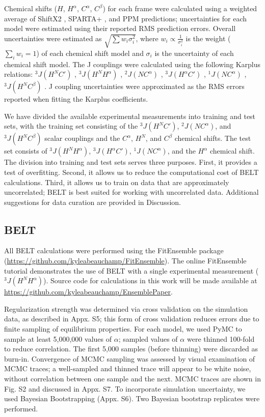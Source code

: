 \documentclass[11pt,titlepage]{article}
\begin{document}
Chemical shifts ($H$, $H^\alpha$, $C^\alpha$, $C^\beta$) for each frame were calculated using a weighted average of ShiftX2 \citep{han2011shiftx2}, SPARTA+  \citep{Shen2010}, and PPM \citep{li2012ppm} predictions; uncertainties for each model were estimated using their reported RMS prediction errors.  Overall uncertainties were estimated as $\sqrt{\sum w_i \sigma_i^2}$, where $w_i \propto \frac{1}{\sigma_i^2}$ is the weight ($\sum_i w_i = 1$) of each chemical shift model and $\sigma_i$ is the uncertainty of each chemical shift model.  The J couplings were calculated using the following Karplus relations: $^3J(H^N C')$  \citep{vogeli2007limits}, $^3J(H^N H^\alpha)$  \citep{vogeli2007limits}, $^2J(N C^\alpha)$  \citep{Graf2007}, $^3J(H^\alpha C')$  \citep{Schmidt1999}, $^1J(N C^\alpha)$  \citep{Graf2007}, $^3J(H^N C^\beta)$  \citep{vogeli2007limits}.  J coupling uncertainties were approximated as the RMS errors reported when fitting the Karplus coefficients.  

We have divided the available experimental measurements into training and test sets, with the training set consisting of the $^3J(H^N C')$,  $^2J(N C^\alpha)$, and $^3J(H^N C^\beta)$ scalar couplings and the $C^\alpha$, $H^N$, and $C^\beta$ chemical shifts.  The test set consists of $^3J(H^N H^\alpha)$, $^3J(H^\alpha C')$, $^1J(N C^\alpha)$, and the $H^\alpha$ chemical shift.  The division into training and test sets serves three purposes.  First, it provides a test of overfitting.  Second, it allows us to reduce the computational cost of BELT calculations.  Third, it allows us to train on data that are approximately uncorrelated; BELT is best suited for working with uncorrelated data.  Additional suggestions for data curation are provided in Discussion.  

\subsection*{BELT}

All BELT calculations were performed using the FitEnsemble package (\url{https://github.com/kyleabeauchamp/FitEnsemble}).  The online FitEnsemble tutorial demonstrates the use of BELT with a single experimental measurement ($^3J(H^N H^\alpha)$).  Source code for calculations in this work will be made available at \url{https://github.com/kyleabeauchamp/EnsemblePaper}.  

Regularization strength was determined via cross validation on the simulation data, as described in Appx. S5; this form of cross validation reduces errors due to finite sampling of equilibrium properties.  For each model, we used PyMC to sample at least 5,000,000 values of $\alpha$; sampled values of $\alpha$ were thinned 100-fold to reduce correlation.  The first 5,000 samples (before thinning) were discarded as burn-in.  Convergence of MCMC sampling was assessed by visual examination of MCMC traces; a well-sampled and thinned trace will appear to be white noise, without correlation between one sample and the next.  MCMC traces are shown in Fig. S2 and discussed in Appx. S7.  To incorporate simulation uncertainty, we used Bayesian Bootstrapping (Appx. S6).  Two Bayesian bootstrap replicates were performed.  
\end{document}
